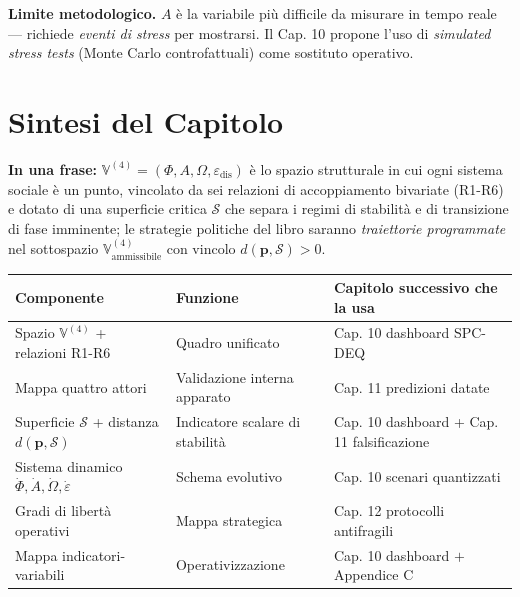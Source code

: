 \Conj{} \textbf{Limite metodologico.} \(A\) è la variabile più difficile
da misurare in tempo reale --- richiede \emph{eventi di stress} per
mostrarsi. Il Cap. 10 propone l'uso di \emph{simulated stress tests}
(Monte Carlo controfattuali) come sostituto operativo.



\section{Sintesi del Capitolo}\label{sintesi-del-capitolo}

\Proved{} \textbf{In una frase:}
\(\mathbb{V}^{(4)} = (\Phi, A, \Omega, \varepsilon_{\text{dis}})\) è lo
spazio strutturale in cui ogni sistema sociale è un punto, vincolato da
sei relazioni di accoppiamento bivariate (R1-R6) e dotato di una
superficie critica \(\mathcal{S}\) che separa i regimi di stabilità e di
transizione di fase imminente; le strategie politiche del libro saranno
\emph{traiettorie programmate} nel sottospazio
\(\mathbb{V}^{(4)}_{\text{ammissibile}}\) con vincolo
\(d(\boldsymbol{p}, \mathcal{S}) > 0\).

{\def\LTcaptype{none} %
{\small\begin{longtable}[]{@{}
  >{\raggedright\arraybackslash}p{}
  >{\raggedright\arraybackslash}p{}
  >{\raggedright\arraybackslash}p{}@{}}
\toprule\noalign{}
\begin{minipage}[b]{\linewidth}\raggedright
Componente
\end{minipage} & \begin{minipage}[b]{\linewidth}\raggedright
Funzione
\end{minipage} & \begin{minipage}[b]{\linewidth}\raggedright
Capitolo successivo che la usa
\end{minipage} \\
\midrule\noalign{}
\endhead
\bottomrule\noalign{}
\endlastfoot
Spazio \(\mathbb{V}^{(4)}\) + relazioni R1-R6 & Quadro unificato & Cap.
10 dashboard SPC-DEQ \\
Mappa quattro attori & Validazione interna apparato & Cap. 11 predizioni
datate \\
Superficie \(\mathcal{S}\) + distanza \(d(\boldsymbol{p}, \mathcal{S})\)
& Indicatore scalare di stabilità & Cap. 10 dashboard + Cap. 11
falsificazione \\
Sistema dinamico \(\dot\Phi, \dot A, \dot\Omega, \dot\varepsilon\) &
Schema evolutivo & Cap. 10 scenari quantizzati \\
Gradi di libertà operativi & Mappa strategica & Cap. 12 protocolli
antifragili \\
Mappa indicatori-variabili & Operativizzazione & Cap. 10 dashboard \(+\)
Appendice C \\
\end{longtable}}
}

